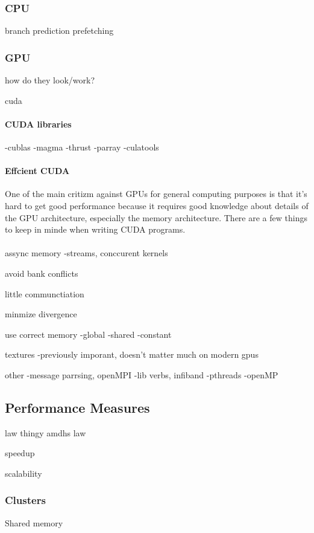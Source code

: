 \documentclass[10pt,a4paper]{article}
\begin{document}
\subsubsection{CPU}
branch prediction
prefetching

\subsubsection{GPU}
how do they look/work?

cuda\cite{cuda}

\paragraph{CUDA libraries}
-cublas
-magma
-thrust
-parray
-culatools

\paragraph{Effcient CUDA}
One of the main critizm against GPUs for general computing purposes is that it's hard to get good performance because it requires good knowledge about details of the GPU architecture, especially the memory architecture. There are a few things to keep in minde when writing CUDA programs.\\
\\
assync memory
-streams, conccurent kernels

avoid bank conflicts

little communctiation

minmize divergence

use correct memory
-global
-shared
-constant

textures
-previously imporant, doesn't matter much on modern gpus

other
-message parrsing, openMPI
-lib verbs, infiband
-pthreads
-openMP

\cite{cuda, cuda_best_practice}

\subsection{Performance Measures}
law thingy amdhs law

speedup

scalability

\subsubsection{Clusters}
Shared memory
\end{document}
